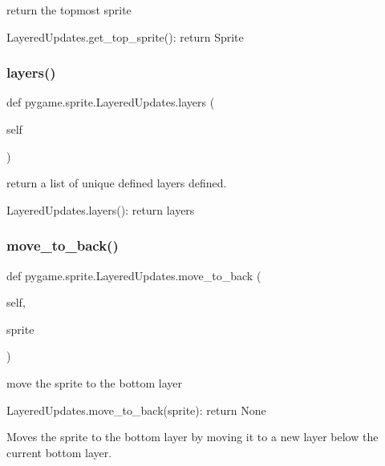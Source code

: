 \begin{DoxyVerb}return the topmost sprite

LayeredUpdates.get_top_sprite(): return Sprite\end{DoxyVerb}
 \mbox{\label{classpygame_1_1sprite_1_1_layered_updates_a81b70d20662914e45995c60d6a13a4a2}} 
\subsubsection{\texorpdfstring{layers()}{layers()}}
{\footnotesize\ttfamily def pygame.\+sprite.\+Layered\+Updates.\+layers (\begin{DoxyParamCaption}\item[{}]{self }\end{DoxyParamCaption})}

\begin{DoxyVerb}return a list of unique defined layers defined.

LayeredUpdates.layers(): return layers\end{DoxyVerb}
 \mbox{\label{classpygame_1_1sprite_1_1_layered_updates_a6c1655db5c38ff9ca1f5dc1b27f9f1d5}} 
\subsubsection{\texorpdfstring{move\+\_\+to\+\_\+back()}{move\_to\_back()}}
{\footnotesize\ttfamily def pygame.\+sprite.\+Layered\+Updates.\+move\+\_\+to\+\_\+back (\begin{DoxyParamCaption}\item[{}]{self,  }\item[{}]{sprite }\end{DoxyParamCaption})}

\begin{DoxyVerb}move the sprite to the bottom layer

LayeredUpdates.move_to_back(sprite): return None

Moves the sprite to the bottom layer by moving it to a new layer below
the current bottom layer.\end{DoxyVerb}
 \mbox{\label{classpygame_1_1sprite_1_1_layered_updates_a452915ddad3c4fea5b0bc6beaf0eba87}} 
